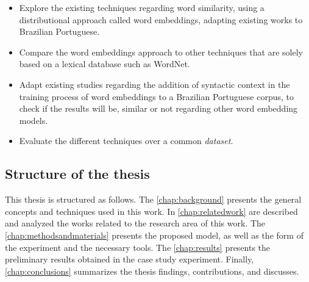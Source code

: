 \begin{itemize}
    \item Explore the existing techniques regarding word similarity, using a distributional approach called word embeddings, adapting existing works to Brazilian Portuguese.
    \item Compare the word embeddings approach to other techniques that are solely based on a lexical database such as WordNet.
    \item Adapt existing studies regarding the addition of syntactic context in the training process of word embeddings to a Brazilian Portuguese corpus, to check if the results will be, similar or not regarding other word embedding models. 
    \item Evaluate the different techniques over a common \textit{dataset}.
\end{itemize}

\subsection{Structure of the thesis}

This thesis is structured as follows. The \autoref{chap:background} presents the general concepts and techniques used in this work. In \autoref{chap:relatedwork} are described and analyzed the works related to the research area of this work. The \autoref{chap:methodsandmaterials} presents the proposed model, as well as the form of the experiment and the necessary tools. 
The \autoref{chap:results} presents the preliminary results obtained in the case study experiment. 
Finally, \autoref{chap:conclusions} summarizes the thesis findings, contributions, and discusses.


